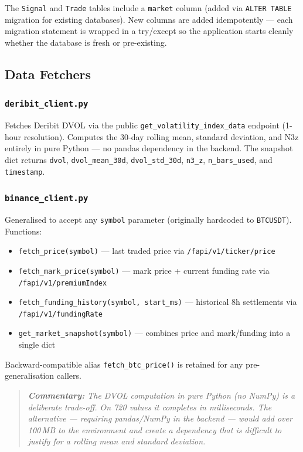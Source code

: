\documentclass[11pt,a4paper]{article}
\newcommand{\code}[1]{\texttt{#1}}
\newcommand{\comment}[1]{%
  \begin{quote}
    \small\itshape\textbf{Commentary:} #1
  \end{quote}
}
\begin{document}
The \code{Signal} and \code{Trade} tables include a \code{market} column (added via \code{ALTER TABLE} migration for existing databases). New columns are added idempotently --- each migration statement is wrapped in a try/except so the application starts cleanly whether the database is fresh or pre-existing.

\subsection{Data Fetchers}

\subsubsection*{\code{deribit\_client.py}}

Fetches Deribit DVOL via the public \code{get\_volatility\_index\_data} endpoint (1-hour resolution). Computes the 30-day rolling mean, standard deviation, and N3z entirely in pure Python --- no pandas dependency in the backend. The snapshot dict returns \code{dvol}, \code{dvol\_mean\_30d}, \code{dvol\_std\_30d}, \code{n3\_z}, \code{n\_bars\_used}, and \code{timestamp}.

\subsubsection*{\code{binance\_client.py}}

Generalised to accept any \code{symbol} parameter (originally hardcoded to \code{BTCUSDT}). Functions:
\begin{itemize}[noitemsep]
  \item \code{fetch\_price(symbol)} --- last traded price via \code{/fapi/v1/ticker/price}
  \item \code{fetch\_mark\_price(symbol)} --- mark price + current funding rate via \code{/fapi/v1/premiumIndex}
  \item \code{fetch\_funding\_history(symbol, start\_ms)} --- historical 8h settlements via \code{/fapi/v1/fundingRate}
  \item \code{get\_market\_snapshot(symbol)} --- combines price and mark/funding into a single dict
\end{itemize}
Backward-compatible alias \code{fetch\_btc\_price()} is retained for any pre-generalisation callers.

\comment{The DVOL computation in pure Python (no NumPy) is a deliberate trade-off. On 720 values it completes in milliseconds. The alternative --- requiring pandas/NumPy in the backend --- would add over 100\,MB to the environment and create a dependency that is difficult to justify for a rolling mean and standard deviation.}
\end{document}
